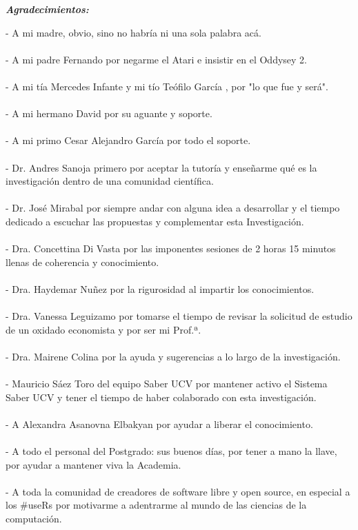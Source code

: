 \documentclass[
  12pt,
  openany]{book}
\begin{document}
\newpage
\begin{center}
\large{\textbf{\emph{\Huge{Agradecimientos:}}}}
\end{center}
\thispagestyle{empty}
\vspace*{2cm}
\thispagestyle{empty}

- A mi madre, obvio, sino no habría ni una sola palabra acá.\\\\
- A mi padre Fernando por negarme el Atari e insistir en el Oddysey 2.\\\\
- A mi tía Mercedes Infante y mi tío Teófilo García \textdagger, por "lo que fue y será".\\\\
- A mi hermano David por su aguante y soporte.\\\\
- A mi primo Cesar Alejandro García por todo el soporte.\\\\
- Dr. Andres Sanoja primero por aceptar la tutoría y enseñarme qué es la investigación dentro de una comunidad científica.\\\\
- Dr. José Mirabal por siempre andar con alguna idea a desarrollar y el tiempo dedicado a escuchar las propuestas y complementar esta Investigación.\\\\
- Dra. Concettina Di Vasta por las imponentes sesiones de 2 horas 15 minutos llenas de coherencia y conocimiento.\\\\
- Dra. Haydemar Nuñez por la rigurosidad al impartir los conocimientos.\\\\
- Dra. Vanessa Leguizamo por tomarse el tiempo de revisar la solicitud de estudio de un oxidado economista y por ser mi Prof.ª.\\\\
- Dra. Mairene Colina por la ayuda y sugerencias a lo largo de la investigación.\\\\
- Mauricio Sáez Toro del equipo Saber UCV por mantener activo el Sistema Saber UCV y tener el tiempo de haber colaborado con esta investigación.\\\\
- A Alexandra Asanovna Elbakyan por ayudar a liberar el conocimiento.\\\\
- A todo el personal del Postgrado: sus buenos días, por tener a mano la llave, por ayudar a mantener viva la Academia.\\\\
- A toda la comunidad de creadores de software libre y open source, en especial a los \#useRs por motivarme a adentrarme al mundo de las ciencias de la computación.\\\\
\end{document}
